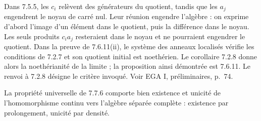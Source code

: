 Dans 7.5.5, les $c_i$ relèvent des générateurs du quotient, tandis
que les $a_j$ engendrent le noyau de carré nul. Leur réunion engendre
l'algèbre : on exprime d'abord l'image d'un élément dans le quotient,
puis la différence dans le noyau. Les seuls produits $c_ia_j$
resteraient dans le noyau et ne pourraient engendrer le quotient.
Dans la preuve de 7.6.11(ii), le système des anneaux localisés
vérifie les conditions de 7.2.7 et son quotient initial est noethérien.
Le corollaire 7.2.8 donne alors la noethérianité de la limite ; la
proposition ainsi démontrée est 7.6.11. Le renvoi à 7.2.8 désigne le
critère invoqué. Voir EGA I, préliminaires, p.~74.

La propriété universelle de 7.7.6 comporte bien existence et unicité
de l'homomorphisme continu vers l'algèbre séparée complète : existence
par prolongement, unicité par densité.
\par
